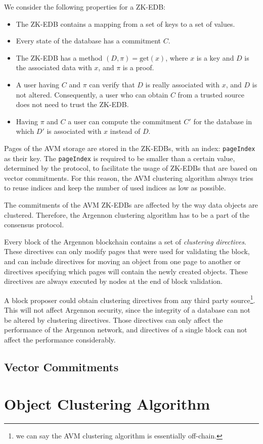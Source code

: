 We consider the following properties for a ZK-EDB:
\begin{itemize}
    \item The ZK-EDB contains a mapping from a set of keys to a set of values.
    \item Every state of the database has a commitment \(C\).
    \item The ZK-EDB has a method \((D, \pi) = \text{get}(x)\), where \(x\) is a key and \(D\) is the associated data
    with \(x\), and \(\pi\) is a proof.
    \item A user having \(C\) and \(\pi\) can verify that \(D\) is really associated with \(x\), and \(D\) is not
    altered. Consequently, a user who can obtain \(C\) from a trusted source does not need to trust the ZK-EDB\@.
    \item Having \(\pi\) and \(C\) a user can compute the commitment \(C'\) for the database in which \(D'\) is
    associated with \(x\) instead of \(D\).
\end{itemize}

Pages of the AVM storage are stored in the ZK-EDBs, with an index: \texttt{pageIndex} as their key.
The \texttt{pageIndex} is required to be smaller than a certain value, determined by the
protocol, to facilitate the usage of ZK-EDBs that are based on vector commitments.
For this reason, the AVM clustering algorithm always tries to reuse indices and keep the number of used indices
as low as possible.

The commitments of the AVM ZK-EDBs are affected by the way data objects are clustered. Therefore,
the Argennon clustering algorithm has to be a part of the consensus protocol.

Every block of the Argennon blockchain contains a set of \emph{clustering directives}. These directives
can only modify pages that were used for validating the block, and can
include directives for moving an object from one page to another or directives specifying which pages will contain
the newly created objects. These directives are always executed by nodes at the end of block validation.

A block proposer could obtain clustering directives from any third party source\footnote{we can say the AVM clustering
algorithm is essentially off-chain.}. This will not
affect Argennon security, since the integrity of a database can not be altered by clustering directives.
Those directives can only affect the performance of the Argennon network, and directives of a single block can
not affect the performance considerably.

\subsection{Vector Commitments}\label{subsec:impl-zk-edbs}


\section{Object Clustering Algorithm}\label{sec:clustering}




